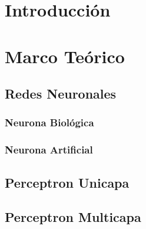 \documentclass[12pt]{article}
\title{}
\begin{document}
\section{Introducción}

\section{Marco Teórico}
\subsection{Redes Neuronales}
\subsubsection{Neurona Biológica}
\subsubsection{Neurona Artificial}
\subsection{Perceptron Unicapa}
\subsection{Perceptron Multicapa}
\end{document}
